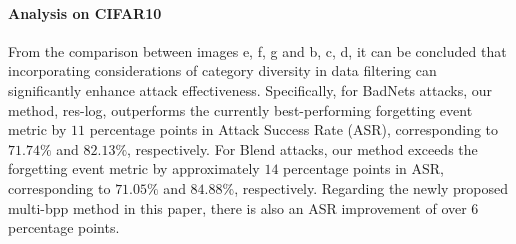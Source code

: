 \documentclass{article}
\begin{document}
\paragraph{Analysis on CIFAR10}
From the comparison between images {e, f, g} and {b, c, d}, it can be concluded that incorporating considerations of category diversity in data filtering can significantly enhance attack effectiveness. Specifically, for BadNets attacks, our method, res-log, outperforms the currently best-performing forgetting event metric by \(11\) percentage points in Attack Success Rate (ASR), corresponding to \(71.74\%\) and \(82.13\%\), respectively. For Blend attacks, our method exceeds the forgetting event metric by approximately \(14\) percentage points in ASR, corresponding to \(71.05\%\) and \(84.88\%\), respectively. Regarding the newly proposed multi-bpp method in this paper, there is also an ASR improvement of over \(6\) percentage points. 
\end{document}
